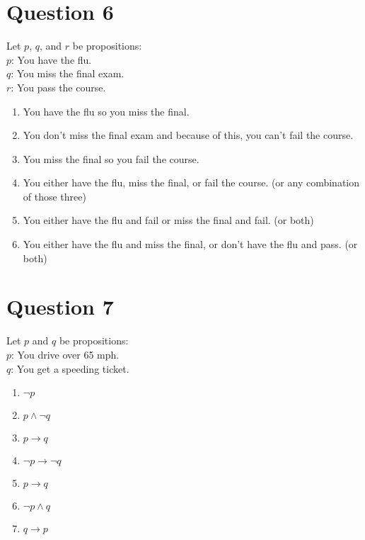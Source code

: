 \documentclass[12pt]{extarticle}
\begin{document}
\section*{Question 6}
	Let $p$, $q$, and $r$ be propositions:\\
		\hspace*{1cm}$p$: You have the flu.\\
		\hspace*{1cm}$q$: You miss the final exam.\\
		\hspace*{1cm}$r$: You pass the course.\\
	\begin{enumerate}
		\item You have the flu so you miss the final.
		\item You don't miss the final exam and because of this, you can't fail the course.
		\item You miss the final so you fail the course.
		\item You either have the flu, miss the final, or fail the course. (or any combination of those three)
		\item You either have the flu and fail or miss the final and fail. (or both) 
		\item You either have the flu and miss the final, or don't have the flu and pass. (or both)
	\end{enumerate}
	\clearpage

\section*{Question 7}
	Let $p$ and $q$ be propositions:\\
		\hspace*{1cm}$p$: You drive over 65 mph.\\
		\hspace*{1cm}$q$: You get a speeding ticket.\\
	\begin{enumerate}
		\item $\neg p$
		\item $p \wedge \neg q$
		\item $p \to q$
		\item $\neg p \to \neg q$
		\item $p \to q$
		\item $\neg p \wedge q$
		\item $q \to p$
	\end{enumerate}
\clearpage
\end{document}
